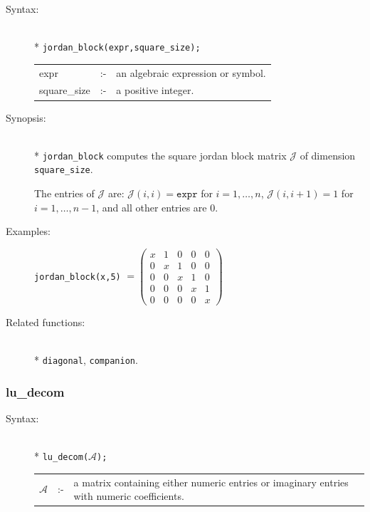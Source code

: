 {\begin{description}
\item[Syntax:]\mbox{}\\*
\texttt{jordan\_block(expr,square\_size);}\\[2mm]
\begin{tabular}{l l l}
expr        &:-& an algebraic expression or symbol. \\
square\_size &:-& a positive integer.
\end{tabular}

\item[Synopsis:]\mbox{}\\*
\texttt{jordan\_block} computes the square jordan block matrix $\mathcal{J}$
                of dimension \texttt{square\_size}.

The entries of $\mathcal{J}$ are: $\mathcal{J}(i,i) = \texttt{expr}$ for
                $i=1,\ldots,n$, $\mathcal{J}(i,i+1) = 1$ for $i=1,\ldots,n-1$,
                and all other entries are 0.

\item[Examples:]\nopagebreak
\begin{flushleft}
\texttt{jordan\_block(x,5)} \(=
 \begin{pmatrix} x & 1 & 0 & 0 & 0 \\ 0 & x & 1 & 0 & 0 \\ 0
& 0 & x & 1 & 0 \\ 0 & 0 & 0 & x & 1 \\ 0 & 0 & 0 & 0 & x
 \end{pmatrix}\)
\end{flushleft}

\item[Related functions:]\mbox{}\\*
\texttt{diagonal}, \texttt{companion}.
\end{description}


\subsubsection{lu\_decom}
\label{linalg:lu_decom}
\hypertarget{operator:LU_DECOM}{}

\begin{description}
\item[Syntax:]\mbox{}\\*
{\tt lu\_decom($\mathcal{A}$);}\\[2mm]
\begin{tabular}{l l l}
$\mathcal{A}$ &:-& \parbox[t]{.848\linewidth}{a matrix containing either
numeric entries or imaginary entries with numeric coefficients.}
\end{tabular}


\end{description}}
